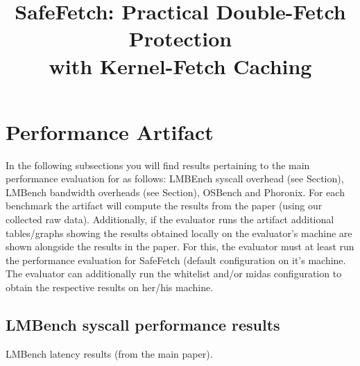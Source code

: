 \let\origthelstnumber\thelstnumber
\makeatletter
\newcommand*\Suppressnumber{%
  \lst@AddToHook{OnNewLine}{%
    \let\thelstnumber\relax%
     \advance\c@lstnumber-\@ne\relax%
    }%
}

\newcommand*\Reactivatenumber[1]{%
  \setcounter{lstnumber}{\numexpr#1-1\relax}
  \lst@AddToHook{OnNewLine}{%
   \let\thelstnumber\origthelstnumber%
   \refstepcounter{lstnumber}%
  }%
}


\makeatother

\makeatletter
\newcommand{\setword}[2]{%
  \phantomsection
  #1\def\@currentlabel{\unexpanded{#1}}\label{#2}%
}
\makeatother

\newcommand{\newpar}[1]{\vspace{0.1cm}\noindent\textbf{#1.}\xspace}



\onecolumn
\date{}

\title{\Large \bf SafeFetch: Practical Double-Fetch Protection\\with Kernel-Fetch Caching}

\section{Performance Artifact}
In the following subsections you will find results pertaining to the main performance
evaluation for \tech as follows: LMBEnch syscall overhead (see Section), 
LMBench bandwidth overheads (see Section), OSBench and Phoronix.
For each benchmark the artifact will compute the results from the paper (using our 
collected raw data).
Additionally, if the evaluator runs the artifact additional tables/graphs showing 
the results obtained locally on the evaluator's machine are shown alongside the 
results in the paper.
For this, the evaluator must at least run the performance evaluation for SafeFetch (default
configuration on it's machine.
The evaluator can additionally run the whitelist and/or midas configuration to obtain the 
respective results on her/his machine.
\subsection{LMBench syscall performance results}
\begin{table}[!h]
  \caption{LMBench latency results (from the main paper).}
  \begin{center}
  \resizebox{0.5\columnwidth}{!}{%
  
  }
\end{center}
\label{tab:lmbench-performance-paper}
\end{table}

